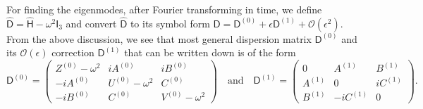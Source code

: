 For finding the eigenmodes, after Fourier transforming in time, we define $\widehat{\mathsf{D}} = \widehat{\mathsf{H}} - \omega^{2}\mathsf{I}_{3}$ and convert $\widehat{\mathsf{D}}$ to its symbol form $\mathsf{D} = \mathsf{D}^{(0)} + \epsilon\mathsf{D}^{(1)} + \mathcal{O}(\epsilon^{2})$.
From the above discussion, we see that most general dispersion matrix $\mathsf{D}^{(0)}$ and its $\mathcal{O}(\epsilon)$ correction $\mathsf{D}^{(1)}$ that can be written down is of the form
%
\begin{equation}
\mathsf{D}^{(0)} =
\begin{pmatrix}
  Z^{(0)} - \omega^{2} & i{A}^{(0)} & i{B}^{(0)}\\
  -i{A}^{(0)} & U^{(0)} - \omega^{2} & {C}^{(0)}\\
  -i{B}^{(0)} & C^{(0)} & V^{(0)} - \omega^{2}
\end{pmatrix}
\quad\text{and}\quad
\mathsf{D}^{(1)} =
\begin{pmatrix}
  0 & {A}^{(1)} & {B}^{(1)}\\
  A^{(1)} & 0 & iC^{(1)} \\
  B^{(1)} & -iC^{(1)} & 0
\end{pmatrix}.
\label{eq::gen_disp_matrix}
\end{equation}


